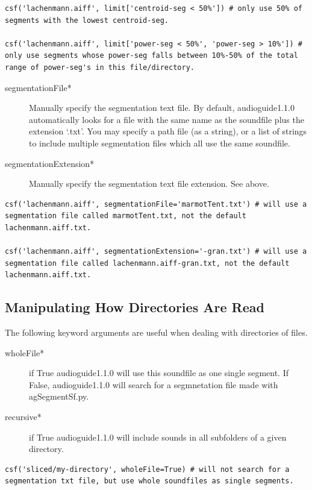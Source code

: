 \documentclass{article}
\newcommand{\ag}{audioguide1.1.0\xspace}
\begin{document}
\begin{spacing}{1.2}
\begin{lstlisting}
csf('lachenmann.aiff', limit['centroid-seg < 50%']) # only use 50% of segments with the lowest centroid-seg.

csf('lachenmann.aiff', limit['power-seg < 50%', 'power-seg > 10%']) # only use segments whose power-seg falls between 10%-50% of the total range of power-seg's in this file/directory.
\end{lstlisting}
\begin{description}
\item[segmentationFile*] Manually specify the segmentation text file. By default, \ag automatically looks for a file with the same name as the soundfile plus the extension `.txt'. You may specify a path file (as a string), or a list of strings to include multiple segmentation files which all use the same soundfile.

\item[segmentationExtension*] Manually specify the segmentation text file extension.  See above.
\end{description}

\begin{lstlisting}
csf('lachenmann.aiff', segmentationFile='marmotTent.txt') # will use a segmentation file called marmotTent.txt, not the default lachenmann.aiff.txt.

csf('lachenmann.aiff', segmentationExtension='-gran.txt') # will use a segmentation file called lachenmann.aiff-gran.txt, not the default lachenmann.aiff.txt.
\end{lstlisting}




\subsection{Manipulating How Directories Are Read}
The following keyword arguments are useful when dealing with directories of files.
\begin{description}
\item[wholeFile*] if True \ag will use this soundfile as one single segment.  If False, \ag will search for a segmnetation file made with agSegmentSf.py.

\item[recursive*] if True \ag will include sounds in all subfolders of a given directory.
\end{description}

\begin{lstlisting}
csf('sliced/my-directory', wholeFile=True) # will not search for a segmentation txt file, but use whole soundfiles as single segments.


\end{lstlisting}
\end{spacing}
\end{document}
